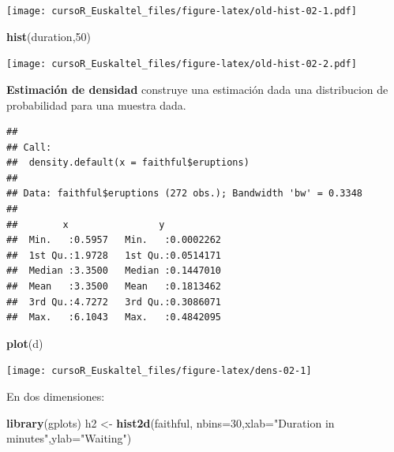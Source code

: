\documentclass[]{book}
\newenvironment{Shaded}{\begin{snugshade}}{\end{snugshade}}
\newcommand{\KeywordTok}[1]{\textcolor[rgb]{0.13,0.29,0.53}{\textbf{#1}}}
\newcommand{\DataTypeTok}[1]{\textcolor[rgb]{0.13,0.29,0.53}{#1}}
\newcommand{\DecValTok}[1]{\textcolor[rgb]{0.00,0.00,0.81}{#1}}
\newcommand{\StringTok}[1]{\textcolor[rgb]{0.31,0.60,0.02}{#1}}
\newcommand{\OperatorTok}[1]{\textcolor[rgb]{0.81,0.36,0.00}{\textbf{#1}}}
\newcommand{\NormalTok}[1]{#1}
\begin{document}
\texttt{[image: cursoR\_Euskaltel\_files/figure-latex/old-hist-02-1.pdf]}

\begin{Shaded}
\begin{Highlighting}[]
\KeywordTok{hist}\NormalTok{(duration,}\DecValTok{50}\NormalTok{)}
\end{Highlighting}
\end{Shaded}

\texttt{[image: cursoR\_Euskaltel\_files/figure-latex/old-hist-02-2.pdf]}

\textbf{Estimación de densidad} construye una estimación dada una
distribucion de probabilidad para una muestra dada.

\begin{Shaded}
\end{Shaded}

\begin{verbatim}
## 
## Call:
##  density.default(x = faithful$eruptions)
## 
## Data: faithful$eruptions (272 obs.); Bandwidth 'bw' = 0.3348
## 
##        x                y            
##  Min.   :0.5957   Min.   :0.0002262  
##  1st Qu.:1.9728   1st Qu.:0.0514171  
##  Median :3.3500   Median :0.1447010  
##  Mean   :3.3500   Mean   :0.1813462  
##  3rd Qu.:4.7272   3rd Qu.:0.3086071  
##  Max.   :6.1043   Max.   :0.4842095
\end{verbatim}

\begin{Shaded}
\begin{Highlighting}[]
\KeywordTok{plot}\NormalTok{(d)}
\end{Highlighting}
\end{Shaded}

\begin{center}\texttt{[image: cursoR\_Euskaltel\_files/figure-latex/dens-02-1]} \end{center}

En dos dimensiones:

\begin{Shaded}
\begin{Highlighting}[]
\KeywordTok{library}\NormalTok{(gplots)}
\NormalTok{h2 <-}\StringTok{ }\KeywordTok{hist2d}\NormalTok{(faithful, }\DataTypeTok{nbins=}\DecValTok{30}\NormalTok{,}\DataTypeTok{xlab=}\StringTok{"Duration in minutes"}\NormalTok{,}\DataTypeTok{ylab=}\StringTok{"Waiting"}\NormalTok{)}
\end{Highlighting}
\end{Shaded}
\end{document}
